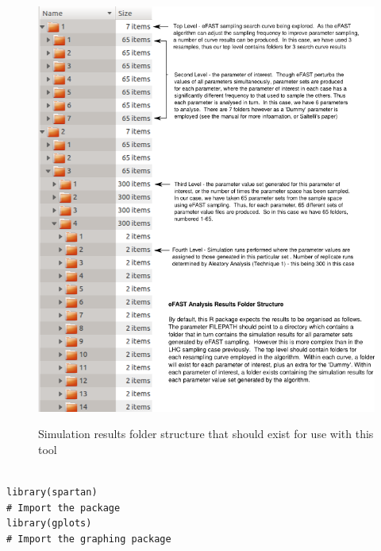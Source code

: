 \documentclass[a4paper,11pt]{article}
\begin{document}
\begin{enumerate}
\begin{figure}
\centering
    \includegraphics[width=\textwidth]{eFAST_Folder_Struc.png}\\ \noindent
    \caption{Simulation results folder structure that should exist for use with this tool}
    \label{eFAST_Folders}
    \newpage 
\end{figure}

\newpage

\begin{verbatim}

library(spartan)
# Import the package
library(gplots)
# Import the graphing package


\end{verbatim}
\end{enumerate}
\end{document}
